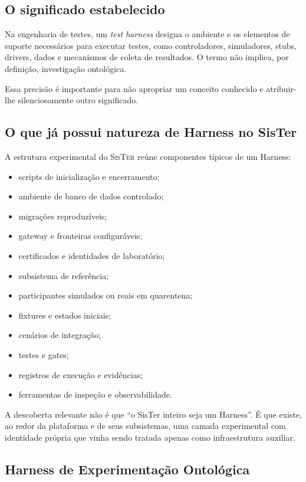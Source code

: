 \documentclass[11pt,a4paper,oneside]{article}
\newcommand{\sister}{\textsc{SisTer}}
\begin{document}
\subsection{O significado estabelecido}

Na engenharia de testes, um \textit{test harness} designa o ambiente e os elementos de suporte necessários para executar testes, como controladores, simuladores, stubs, drivers, dados e mecanismos de coleta de resultados. O termo não implica, por definição, investigação ontológica.

Essa precisão é importante para não apropriar um conceito conhecido e atribuir-lhe silenciosamente outro significado.

\subsection{O que já possui natureza de Harness no SisTer}

A estrutura experimental do \sister{} reúne componentes típicos de um Harness:

\begin{itemize}
  \item scripts de inicialização e encerramento;
  \item ambiente de banco de dados controlado;
  \item migrações reproduzíveis;
  \item gateway e fronteiras configuráveis;
  \item certificados e identidades de laboratório;
  \item subsistema de referência;
  \item participantes simulados ou reais em quarentena;
  \item fixtures e estados iniciais;
  \item cenários de integração;
  \item testes e gates;
  \item registros de execução e evidências;
  \item ferramentas de inspeção e observabilidade.
\end{itemize}

A descoberta relevante não é que ``o SisTer inteiro seja um Harness''. É que existe, ao redor da plataforma e de seus subsistemas, uma camada experimental com identidade própria que vinha sendo tratada apenas como infraestrutura auxiliar.

\subsection{Harness de Experimentação Ontológica}
\end{document}

